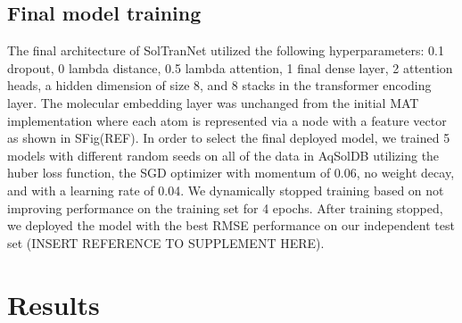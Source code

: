 \documentclass[journal=jmcmar,manuscript=article]{achemso}
\begin{document}
\subsection{Final model training}
The final architecture of SolTranNet utilized the following hyperparameters: 0.1 dropout, 0 lambda distance, 0.5 lambda attention, 1 final dense layer, 2 attention heads, a hidden dimension of size 8, and 8 stacks in the transformer encoding layer.
The molecular embedding layer was unchanged from the initial MAT implementation\cite{MAT} where each atom is represented via a node with a feature vector as shown in SFig(REF).
In order to select the final deployed model, we trained 5 models with different random seeds on all of the data in AqSolDB utilizing the huber loss function, the SGD optimizer with momentum of 0.06, no weight decay, and with a learning rate of 0.04.
We dynamically stopped training based on not improving performance on the training set for 4 epochs.
After training stopped, we deployed the model with the best RMSE performance on our independent test set (INSERT REFERENCE TO SUPPLEMENT HERE).

\section{Results}
\end{document}
